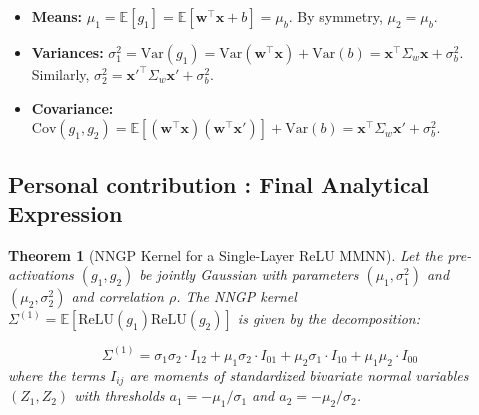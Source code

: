 \documentclass[11pt]{article}
\newtheorem{theorem}{Theorem}
\begin{document}
\begin{tcolorbox}[colback=green!5,colframe=green!80!black,title={\textbf{Remark: Bivariate Gaussian Parameters}},enhanced,drop shadow,boxrule=2pt]
\begin{itemize}
    \item \textbf{Means:} $\mu_1 = \mathbb{E}[g_1] = \mathbb{E}[\bm{w}^\top\bm{x} + b] = \mu_b$. By symmetry, $\mu_2 = \mu_b$.
    \item \textbf{Variances:} $\sigma_1^2 = \text{Var}(g_1) = \text{Var}(\bm{w}^\top\bm{x}) + \text{Var}(b) = \bm{x}^\top \Sigma_w \bm{x} + \sigma_b^2$. Similarly, $\sigma_2^2 = {\bm{x}'}^\top \Sigma_w \bm{x}' + \sigma_b^2$.
    \item \textbf{Covariance:} $\text{Cov}(g_1, g_2) = \mathbb{E}[(\bm{w}^\top\bm{x})(\bm{w}^\top\bm{x}')] + \text{Var}(b) = \bm{x}^\top \Sigma_w \bm{x}' + \sigma_b^2$.
\end{itemize}
\end{tcolorbox}

\subsection{Personal contribution : Final Analytical Expression}
\begin{theorem}[NNGP Kernel for a Single-Layer ReLU MMNN]
Let the pre-activations $(g_1, g_2)$ be jointly Gaussian with parameters $(\mu_1, \sigma_1^2)$ and $(\mu_2, \sigma_2^2)$ and correlation $\rho$. The NNGP kernel $\Sigma^{(1)} = \mathbb{E}[\text{ReLU}(g_1)\text{ReLU}(g_2)]$ is given by the decomposition:

\begin{tcolorbox}[colback=blue!10,colframe=blue!80!black,title={\textbf{NNGP Kernel Decomposition}},enhanced,drop shadow,boxrule=2pt]
\begin{equation}
\label{eq:final_ntk_decomp}
\boxed{
\Sigma^{(1)} = \sigma_1\sigma_2 \cdot I_{12} + \mu_1\sigma_2 \cdot I_{01} + \mu_2\sigma_1 \cdot I_{10} + \mu_1\mu_2 \cdot I_{00}
}
\end{equation}
where the terms $I_{ij}$ are moments of standardized bivariate normal variables $(Z_1, Z_2)$ with thresholds $a_1 = -\mu_1/\sigma_1$ and $a_2 = -\mu_2/\sigma_2$.
\end{tcolorbox}
\end{theorem}
\end{document}
